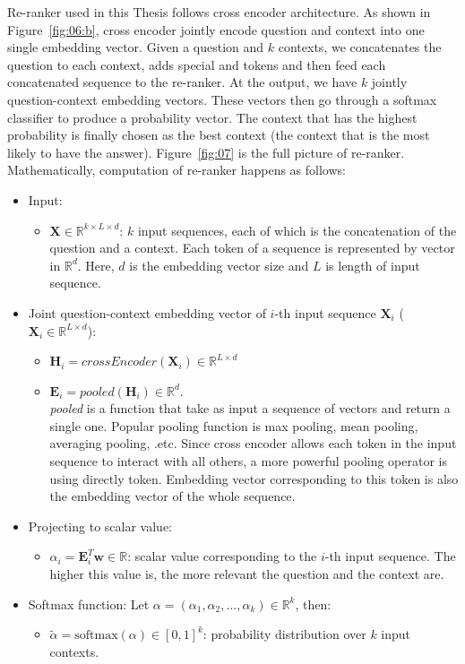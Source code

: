 \documentclass[12pt, sort&compress]{report}
\begin{document}
\par Re-ranker used in this Thesis follows cross encoder architecture. As shown in Figure~\ref{fig:06:b}, cross encoder jointly encode question and context into one single embedding vector. Given a question and $k$ contexts, we concatenates the question to each context, adds special {\sffamily [CLS]} and {\sffamily [SEP]} tokens and then feed each concatenated sequence to the re-ranker. At the output, we have $k$ jointly question-context embedding vectors. These vectors then go through a softmax classifier to produce a probability vector. The context that has the highest probability is finally chosen as the best context (the context that is the most likely to have the answer). Figure~\ref{fig:07} is the full picture of re-ranker. Mathematically, computation of re-ranker happens as follows:
\begin{itemize}
	\item Input:
	\begin{itemize}
		\item $\mathbf{X} \in \mathbb{R}^{k \times L \times d}$: $k$ input sequences, each of which is the concatenation of the question and a context. Each token of a sequence is represented by vector in $\mathbb{R}^d$. Here, $d$ is the embedding vector size and $L$ is length of input sequence.
	\end{itemize}
	\item Joint question-context embedding vector of $i$-th input sequence $\mathbf{X}_i$ ($\mathbf{X}_i \in \mathbb{R}^{L \times d}$):
	\begin{itemize}
		\item $\mathbf{H}_i = crossEncoder\left(\mathbf{X}_i\right) \in \mathbb{R}^{L \times d}$
		\item $\mathbf{E}_i = pooled\left(\mathbf{H}_i\right) \in \mathbb{R}^d$. \\\textit{pooled} is a function that take as input a sequence of vectors and return a single one. Popular pooling function is max pooling, mean pooling, averaging pooling, .etc. Since cross encoder allows each token in the input sequence to interact with all others, a more powerful pooling operator is using directly {\sf [CLS]} token. Embedding vector corresponding to this token is also the embedding vector of the whole sequence.
	\end{itemize}
	\item Projecting to scalar value:
	\begin{itemize}
		\item $\alpha_i = \mathbf{E}_i^T\mathbf{w} \in \mathbb{R}$: scalar value corresponding to the $i$-th input sequence. The higher this value is, the more relevant the question and the context are.
	\end{itemize}
	\item Softmax function: Let $\alpha = \left(\alpha_1, \alpha_2, ..., \alpha_k\right) \in \mathbb{R}^k$, then:
	\begin{itemize}
		\item $\tilde{\alpha} = \text{softmax}\left(\alpha\right) \in [0, 1]^k$: probability distribution over $k$ input contexts.
	\end{itemize}
\end{itemize}
\end{document}
